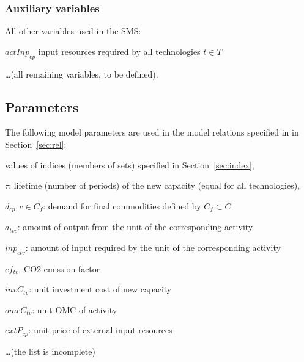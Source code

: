 \documentclass[a4paper,12pt]{article}
\begin{document}
\subsubsection{Auxiliary variables}
All other variables used in the SMS:
\btlb
\item $actInp_{cp}$ input resources required by all technologies $t \in T$
\item \dots (all remaining variables, to be defined).
\etl

\subsection{Parameters}
The following model parameters are used in the model relations 
specified in in Section~\ref{sec:rel}:
\btlb
\item values of indices (members of sets) specified in Section~\ref{sec:index},
\item $\tau$: lifetime (number of periods) of the new capacity (equal for all
	technologies),
\item $d_{cp}, c \in C_f$: demand for final commodities defined by $C_f \subset C$
\item $a_{tvc}$: amount of output from the unit of the corresponding activity
\item $inp_{ctv}$: amount of input required by the unit of the corresponding activity
\item $ef_{tv}$: CO2 emission factor
\item $invC_{tv}$: unit investment cost of new capacity
\item $omcC_{tv}$: unit OMC of activity
\item $extP_{cp}$: unit price of external input resources
\item \dots (the list is incomplete)
\etl
\end{document}
